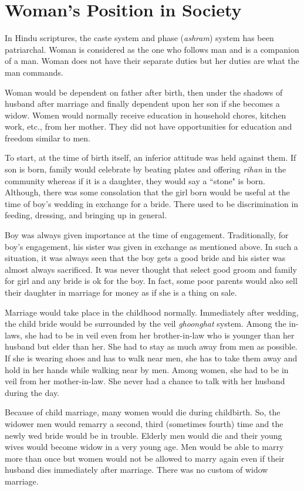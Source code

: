 \chapter{Woman's Position in Society}
In Hindu scriptures, the caste system and phase (\textit{ashram}) system has
been patriarchal. Woman is considered as the one who follows man and is a
companion of a man. Woman does not have their separate duties but her duties
are what the man commands.

Woman would be dependent on father after birth, then under the shadows of
husband after marriage and finally dependent upon her son if she becomes a
widow. Women would normally receive education in household chores, kitchen
work, etc., from her mother. They did not have opportunities for education and
freedom similar to men.

To start, at the time of birth itself, an inferior attitude was held against
them. If son is born, family would celebrate by beating plates and offering
\textit{rihan} in the community whereas if it is a daughter, they would say a
``stone" is born. Although, there was some consolation that the girl born would
be useful at the time of boy's wedding in exchange for a bride. There used to
be discrimination in feeding, dressing, and bringing up in general.

Boy was always given importance at the time of engagement. Traditionally, for
boy's engagement, his sister was given in exchange as mentioned above. In such
a situation, it was always seen that the boy gets a good bride and his sister
was almost always sacrificed. It was never thought that select good groom and
family for girl and any bride is ok for the boy. In fact, some poor parents
would also sell their daughter in marriage for money as if she is a thing on
sale.

Marriage would take place in the childhood normally. Immediately after wedding,
the child bride would be surrounded by the veil \textit{ghoonghat} system. Among
the in-laws, she had to be in veil even from her brother-in-law who is younger
than her husband but elder than her. She had to stay as much away from men as
possible. If she is wearing shoes and has to walk near men, she has to take
them away and hold in her hands while walking near by men. Among women, she had
to be in veil from her mother-in-law. She never had a chance to talk with her
husband during the day.

Because of child marriage, many women would die during childbirth. So, the
widower men would remarry a second, third (sometimes fourth) time and the newly
wed bride would be in trouble. Elderly men would die and their young wives
would become widow in a very young age. Men would be able to marry more than
once but women would not be allowed to marry again even if their husband dies
immediately after marriage. There was no custom of widow marriage.

